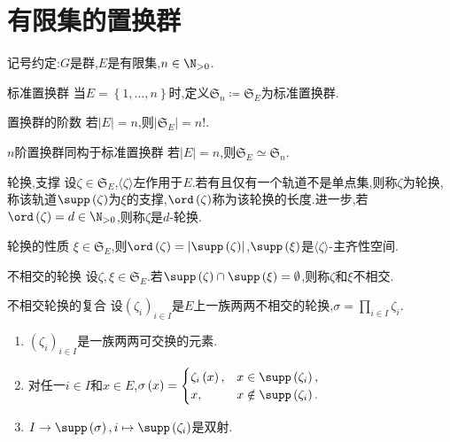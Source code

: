 \section{有限集的置换群}

记号约定:$G$是群,$E$是有限集,$n\in\N_{>0}$.

\begin{definition}{标准置换群}{}
	当$E=\left\{1,\ldots,n\right\}$时,定义$\mathfrak{S}_{n}\coloneq\mathfrak{S}_{E}$为标准置换群.
\end{definition}

\begin{proposition}{置换群的阶数}{}
	若$\left|E\right|=n$,则$\left|\mathfrak{S}_{E}\right|=n!$.
\end{proposition}

\begin{proposition}{$n$阶置换群同构于标准置换群}{}
	若$\left|E\right|=n$,则$\mathfrak{S}_{E}\simeq\mathfrak{S}_{n}$.
\end{proposition}

\begin{definition}{轮换,支撑}{}
	设$\zeta\in\mathfrak{S}_{E}$,$\langle\zeta\rangle$左作用于$E$.若有且仅有一个轨道不是单点集,则称$\zeta$为轮换,称该轨道$\supp\left(\zeta\right)$为$\xi$的支撑,$\ord\left(\zeta\right)$称为该轮换的长度.进一步,若$\ord\left(\zeta\right)=d\in\N_{>0}$,则称$\zeta$是$d$-轮换.
\end{definition}

\begin{theorem}{轮换的性质}{}
	$\xi\in\mathfrak{S}_{E}$,则$\ord\left(\zeta\right)=\left|\supp\left(\zeta\right)\right|$,$\supp\left(\xi\right)$是$\langle\zeta\rangle$-主齐性空间.
\end{theorem}

\begin{definition}{不相交的轮换}{}
	设$\zeta,\xi\in\mathfrak{S}_{E}$.若$\supp\left(\zeta\right)\cap\supp\left(\xi\right)=\emptyset$,则称$\zeta$和$\xi$不相交.
\end{definition}

\begin{lemma}{不相交轮换的复合}{}
	设$\left(\zeta_{i}\right)_{i\in I}$是$E$上一族两两不相交的轮换,$\sigma=\prod\limits_{i\in I}\zeta_{i}$.
	\begin{enumerate}
		\item $\left(\zeta_{i}\right)_{i\in I}$是一族两两可交换的元素.
		\item 对任一$i\in I$和$x\in E$,$\sigma\left(x\right)=
		\begin{cases}
			\zeta_{i}\left(x\right),&x\in\supp\left(\zeta_{i}\right),\\
			x,&x\notin\supp\left(\zeta_{i}\right).
		\end{cases}$
		\item $I\to\supp\left(\sigma\right),i\mapsto\supp\left(\zeta_{i}\right)$是双射.
	\end{enumerate}
\end{lemma}

